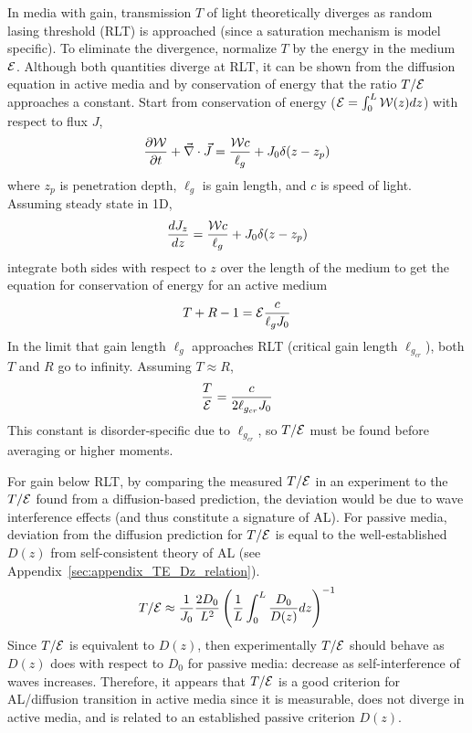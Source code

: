 In media with gain, transmission $T$ of light theoretically diverges as random lasing threshold (RLT) is approached (since a saturation mechanism is model specific). To eliminate the divergence, normalize $T$ by the energy in the medium ${\cal E}$. Although both quantities diverge at RLT, it can be shown from the diffusion equation in active media\cite{2009_Payne_TE} and by conservation of energy that the ratio $T/{\cal E}$ approaches a constant. Start from conservation of energy (${\cal E} =\int_0^L{\cal W}(z)dz$) with respect to flux $J$,
\begin{equation}
\frac{\partial {\cal W}}{\partial t} + \vec{\nabla} \cdot \vec{J} = \frac{{\cal W} c}{\ell_g} + J_0 \delta(z-z_p)
\label{eq:conservation_flux}
\end{equation}
where $z_p$ is penetration depth, $\ell_g$ is gain length, and $c$ is speed of light. Assuming steady state in 1D, 
\begin{equation}
\frac{d J_z}{dz} = \frac{{\cal W} c}{\ell_g} + J_0 \delta(z-z_p)
\label{eq:oned_no_time_JW}
\end{equation}
integrate both sides with respect to $z$ over the length of the medium to get the equation for conservation of energy for an active medium
\begin{equation}
T + R -1 = {\cal E} \frac{c}{\ell_g J_0}
\label{eq:conservation_energy_active_medium}
\end{equation}
In the limit that gain length $\ell_g$ approaches RLT (critical gain length $\ell_{g_{cr}}$), both $T$ and $R$ go to infinity. Assuming $T \approx R$,
\begin{equation}
\frac{T}{{\cal E}} = \frac{c}{2 \ell_{g_{cr}}J_0}
\label{eq:TE_RLT_limit}
\end{equation}
This constant is disorder-specific due to $\ell_{g_{cr}}$, so $T/{\cal E}$ must be found before averaging or higher moments.

For gain below RLT, by comparing the measured $T/{\cal E}$ in an experiment to the $T/{\cal E}$ found from a diffusion-based prediction, the deviation would be due to wave interference effects (and thus constitute a signature of AL). For passive media, deviation from the diffusion prediction for $T/{\cal E}$ is equal\cite{2009_Payne_TE} to the well-established \cite{2008_Cherroret} $D(z)$ from self-consistent theory of AL (see Appendix~\ref{sec:appendix_TE_Dz_relation}).
\begin{equation}
T/{\cal E} \approx \frac{1}{J_0} \frac{2 D_0}{L^2} \left(\frac{1}{L} \int_0^L \frac{D_0}{D(z)} dz \right)^{-1}
\label{eq:TE_related_Dz}
\end{equation}
Since $T/{\cal E}$ is equivalent to $D(z)$, then experimentally $T/{\cal E}$ should behave as $D(z)$ does with respect to $D_0$ for passive media: decrease as self-interference of waves increases. Therefore, it appears that $T/{\cal E}$ is a good criterion for AL/diffusion transition in active media since it is measurable, does not diverge in active media, and is related to an established passive criterion $D(z)$.


